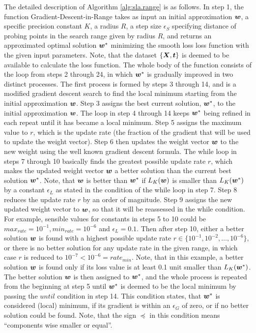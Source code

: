 The detailed description of Algorithm \ref{alg:sla.range} is as follows. In step 1, the function {\sc Gradient-Descent-in-Range} takes as input an initial approximation $\boldsymbol{w}$, a specific precision constant $K$, a radius $R$, a step size $\epsilon_S$ specifying distance of probing points in the search range given by radius $R$, and returns an approximated optimal solution $\boldsymbol{w}^*$ minimizing the smooth loss loss function with the given input parameters. Note, that the dataset $\{\boldsymbol{X}, \boldsymbol{t} \}$ is deemed to be available to calculate the loss function. The whole body of the function consists of the loop from steps 2 through 24, in which $\boldsymbol{w}^*$ is gradually improved in two distinct processes. The first process is formed by steps 3 through 14, and is a modified gradient descent search to find the local minimum starting from the initial approximation $\boldsymbol{w}$. Step 3 assigns the best current solution, $\boldsymbol{w}^*$, to the initial approximation $\boldsymbol{w}$. The loop in step 4 through 14 keeps $\boldsymbol{w}^*$ being refined in each repeat until it has became a local minimum. Step 5 assigns the maximum value to $r$, which is the update rate (the fraction of the gradient that will be used to update the weight vector). Step 6 then updates the weight vector $\boldsymbol{w}$ to the new weight using the well known gradient descent formula. The while loop in steps 7 through 10 basically finds the greatest possible update rate $r$, which makes the updated weight vector $\boldsymbol{w}$ a better solution than the current best solution $\boldsymbol{w}^*$. Note, that $\boldsymbol{w}$ is better than $\boldsymbol{w}^*$ if $L_K(\boldsymbol{w})$ is smaller than $L_K(\boldsymbol{w}^*)$ by a constant $\epsilon_L$ as stated in the  condition of the while loop in step 7. Step 8 reduces the update rate $r$ by an order of magnitude. Step 9 assigns the new updated weight vector to $\boldsymbol{w}$, so that it will be reassessed in the while condition. For example, sensible values for constants in steps 5 to 10 could be $max_{rate} = 10^{-1}, min_{rate} = 10^{-6}$ and $\epsilon_L=0.1$. Then after step 10, either a better solution $\boldsymbol{w}$ is found with a highest possible update rate $r \in \{ 10^{-1}, 10^{-2}, \dots, 10^{-6} \}$, or there is no better solution for any update rate in the given range, in which case $r$ is reduced to $10^{-7} < 10^{-6} = rate_{min}$. Note, that in this example, a better solution $\boldsymbol{w}$ is found only if its loss value is at least 0.1 unit smaller than $L_K(\boldsymbol{w}^*)$. The better solution $\boldsymbol{w}$ is then assigned to $\boldsymbol{w}^*$, and the whole process is repeated from the beginning at step 5 until $\boldsymbol{w}^*$ is deemed to be the local minimum by passing the $until$ condition in step 14. This condition states, that $\boldsymbol{w}^*$ is considered (local) minimum, if its gradient is within an $\epsilon_G$ of zero, or if no better solution could be found. Note, that the sign $\preccurlyeq$ in this condition means ``components wise smaller or equal''. 

